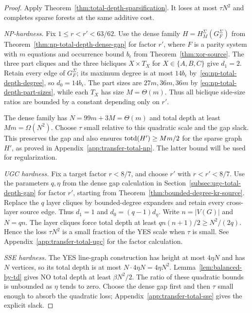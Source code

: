 \begin{proof}
Apply Theorem~\ref{thm:total-depth-sparsification}.
It loses at most $\tau N^2$ and completes sparse forests at the
same additive cost.

\emph{NP-hardness.}
Fix $1\le r<r'<63/62$. Use the dense family
$H=H^\Sigma_M(G_F^\Sigma)$ from
Theorem~\ref{thm:np-total-depth-dense-gap} for factor $r'$, where
$F$ is a parity system with $m$ equations and occurrence bound
$b_\epsilon$ from Theorem~\ref{thm:xor-source}.
The three part cliques and the three bicliques $X\times T_X$
for $X\in\{A,B,C\}$
give $d_1=2$. Retain every edge of $G_F^\Sigma$; its maximum degree
is at most $14b_\epsilon$ by~\eqref{eq:np-total-depth-degree}, so
$d_0=14b_\epsilon$. The part sizes are $27m,36m,36m$ by
\eqref{eq:np-total-depth-part-sizes}, while each $T_X$ has size
$M=\Theta(m)$. Thus all biclique side-size ratios are bounded by
a constant depending only on $r'$.

The dense family has $N=99m+3M=\Theta(m)$ and total depth at
least $Mm=\Omega(N^2)$. Choose $\tau$ small relative to this
quadratic scale and the gap slack. This preserves the gap and also
ensures $\operatorname{totd}(H')\ge Mm/2$ for the sparse graph $H'$, as proved
in Appendix~\ref{app:transfer-total-np}. The latter bound will be
used for regularization.

\emph{UGC hardness.}
Fix a target factor $r<8/7$, and choose $r'$ with
$r<r'<8/7$. Use the parameters $q,\eta$ from the dense gap
calculation in Section~\ref{subsec:ugc-total-depth-gap} for factor $r'$, starting from
Theorem~\ref{thm:bounded-degree-kr-source}. Replace the $q$ layer
cliques by bounded-degree expanders and retain every cross-layer
source edge. Thus $d_1=1$ and $d_0=(q-1)d_\eta$.
Write $n=|V(G)|$ and $N=qn$. The layer cliques force total depth at least
$q n(n+1)/2\ge N^2/(2q)$. Hence the loss $\tau N^2$ is a
small fraction of the YES scale when $\tau$ is small. See
Appendix~\ref{app:transfer-total-ugc} for the factor calculation.

\emph{SSE hardness.}
The YES line-graph construction has height at most $4\eta N$ and
has $N$ vertices, so its total depth is at most
$N\cdot4\eta N=4\eta N^2$. Lemma~\ref{lem:balanced-by-td} gives NO total depth
at least $\beta N^2/2$. The ratio of these quadratic bounds is unbounded as $\eta$ tends
to zero. Choose the dense gap first and then $\tau$ small enough
to absorb the quadratic loss; Appendix~\ref{app:transfer-total-sse}
gives the explicit slack.

\end{proof}


